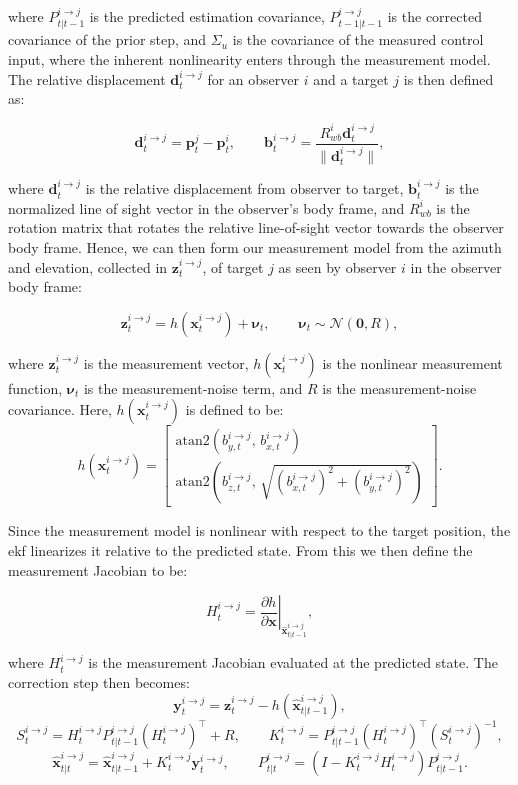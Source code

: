where  $P^{i\to j}_{t|t-1}$ is the predicted estimation covariance, $P^{i\to j}_{t-1|t-1}$ is the corrected covariance of the prior step, and $\Sigma_u$ is the covariance of the measured control input, where the inherent nonlinearity enters through the measurement model. The relative displacement $\mathbf{d}^{i\to j}_t$ for an observer $i$ and a target $j$ is then defined as: 

\[
\mathbf{d}^{i\to j}_t = \mathbf{p}^j_t - \mathbf{p}^i_t,
\qquad
\mathbf{b}^{i\to j}_t = \frac{R^i_{wb}\mathbf{d}^{i\to j}_t}{\|\mathbf{d}^{i\to j}_t\|},
\]

where $\mathbf{d}^{i\to j}_t$ is the relative displacement from observer to target, $\mathbf{b}^{i\to j}_t$ is the normalized line of sight vector in the observer's body frame, and $R^i_{wb}$ is the rotation matrix that rotates the relative line-of-sight vector towards the observer body frame. Hence, we can then form our measurement model from the azimuth and elevation, collected in $\mathbf{z}^{i\to j}_t$, of target $j$ as seen by observer $i$ in the observer body frame:

\[
\mathbf{z}^{i\to j}_t =
h(\mathbf{x}^{i\to j}_t) + \mathbf{\nu}_t,
\qquad
\mathbf{\nu}_t \sim \mathcal{N}(\mathbf{0},R),
\]

where $\mathbf{z}^{i\to j}_t$ is the measurement vector, $h(\mathbf{x}^{i\to j}_t)$ is the nonlinear measurement function, $\mathbf{\nu}_t$ is the measurement-noise term, and $R$ is the measurement-noise covariance. Here, $h(\mathbf{x}^{i\to j}_t)$ is defined to be:
\[
h(\mathbf{x}^{i\to j}_t)=
\begin{bmatrix}
\mathrm{atan2}(b^{i\to j}_{y,t},\,b^{i\to j}_{x,t})\\[4pt]
\mathrm{atan2}\!\left(b^{i\to j}_{z,t},\,\sqrt{(b^{i\to j}_{x,t})^2+(b^{i\to j}_{y,t})^2}\right)
\end{bmatrix}.
\]

Since the measurement model is nonlinear with respect to the target position, the \acs{ekf} linearizes it relative to the predicted state. From this we then define the measurement Jacobian to be:

\[
H^{i\to j}_t = \left.\frac{\partial h}{\partial \mathbf{x}}\right|_{\hat{\mathbf{x}}^{i\to j}_{t|t-1}},
\]

where $H^{i\to j}_t$ is the measurement Jacobian evaluated at the predicted state. The correction step then becomes:
\[
\mathbf{y}^{i\to j}_t = \mathbf{z}^{i\to j}_t - h(\hat{\mathbf{x}}^{i\to j}_{t|t-1}),
\]
\[
S^{i\to j}_t = H^{i\to j}_t P^{i\to j}_{t|t-1}(H^{i\to j}_t)^\top + R,
\qquad
K^{i\to j}_t = P^{i\to j}_{t|t-1}(H^{i\to j}_t)^\top (S^{i\to j}_t)^{-1},
\]
\[
\hat{\mathbf{x}}^{i\to j}_{t|t} =
\hat{\mathbf{x}}^{i\to j}_{t|t-1} + K^{i\to j}_t\mathbf{y}^{i\to j}_t,
\qquad
P^{i\to j}_{t|t} =
(I - K^{i\to j}_t H^{i\to j}_t)P^{i\to j}_{t|t-1}.
\]


